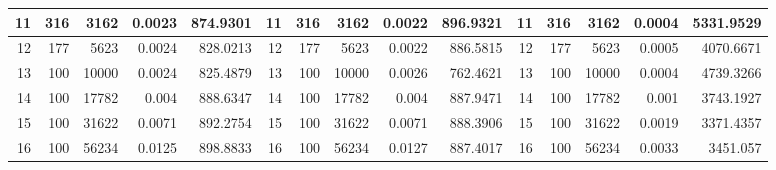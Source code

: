 \begin{table}[htbp]
\begin{tabular}{|r|r|r|r|r|r|r|r|r|r|r|r|r|r|r|}
		\midrule
		11                                & 316                             & 3162                            & 0.0023                             & 874.9301                             & 11                               & 316                             & 3162                            & 0.0022                             & 896.9321                             & 11 & 316      & 3162  & 0.0004 & 5331.9529 \\
		\midrule
		12                                & 177                             & 5623                            & 0.0024                             & 828.0213                             & 12                               & 177                             & 5623                            & 0.0022                             & 886.5815                             & 12 & 177      & 5623  & 0.0005 & 4070.6671 \\
		\midrule
		13                                & 100                             & 10000                           & 0.0024                             & 825.4879                             & 13                               & 100                             & 10000                           & 0.0026                             & 762.4621                             & 13 & 100      & 10000 & 0.0004 & 4739.3266 \\
		\midrule
		14                                & 100                             & 17782                           & 0.004                              & 888.6347                             & 14                               & 100                             & 17782                           & 0.004                              & 887.9471                             & 14 & 100      & 17782 & 0.001  & 3743.1927 \\
		\midrule
		15                                & 100                             & 31622                           & 0.0071                             & 892.2754                             & 15                               & 100                             & 31622                           & 0.0071                             & 888.3906                             & 15 & 100      & 31622 & 0.0019 & 3371.4357 \\
		\midrule
		16                                & 100                             & 56234                           & 0.0125                             & 898.8833                             & 16                               & 100                             & 56234                           & 0.0127                             & 887.4017                             & 16 & 100      & 56234 & 0.0033 & 3451.057  \\

\end{tabular}
\end{table}
